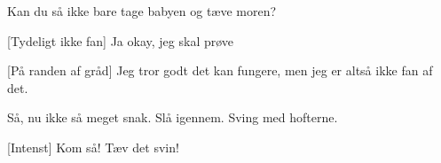 \documentclass[a4paper,11pt]{article}
\begin{document}
\begin{sketch}
 Kan du så ikke bare tage babyen og tæve moren? 

[Tydeligt ikke fan] Ja okay, jeg skal prøve


[På randen af gråd] Jeg tror godt det kan fungere, men jeg er altså ikke fan af det.

 Så, nu ikke så meget snak. Slå igennem. Sving med hofterne.



[Intenst] Kom så! Tæv det svin! 
\end{sketch}
\end{document}
